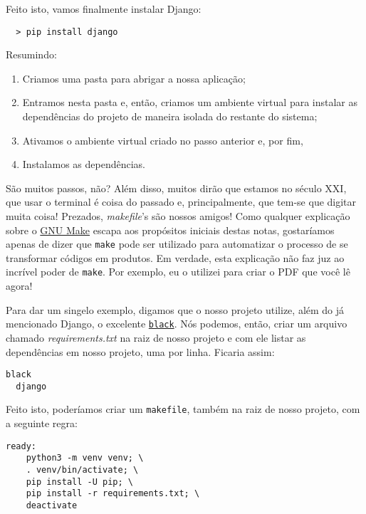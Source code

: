 Feito isto, vamos finalmente instalar Django:

\begin{lstlisting}
  > pip install django
\end{lstlisting}

Resumindo:

\begin{enumerate}
  \item
    Criamos uma pasta para abrigar a nossa aplicação;
  \item
    Entramos nesta pasta e, então, criamos um ambiente virtual para instalar as
    dependências do projeto de maneira isolada do restante do sistema;
  \item
    Ativamos o ambiente virtual criado no passo anterior e, por fim,
  \item
    Instalamos as dependências.
\end{enumerate}

São muitos passos, não? Além disso, muitos dirão que estamos no século XXI, que
usar o terminal é coisa do passado e, principalmente, que tem-se que digitar
muita coisa! Prezados, \textit{makefile}'s são nossos amigos! Como qualquer
explicação sobre o \href{https://www.gnu.org/software/make/}{GNU Make} escapa
aos propósitos iniciais destas notas, gostaríamos apenas de dizer que
\texttt{make} pode ser utilizado para automatizar o processo de se transformar
códigos em produtos. Em verdade, esta explicação não faz juz ao incrível poder
de \texttt{make}. Por exemplo, eu o utilizei para criar o PDF que você lê agora!

Para dar um singelo exemplo, digamos que o nosso projeto utilize, além do já
mencionado Django, o excelente
\href{https://github.com/psf/black}{\texttt{black}}. Nós podemos, então, criar
um arquivo chamado \textit{requirements.txt} na raiz de nosso projeto e com ele
listar as dependências em nosso projeto, uma por linha. Ficaria assim:

\begin{lstlisting}[caption={Um exemplo de requirements.txt}]
  black
  django
\end{lstlisting}

Feito isto, poderíamos criar um \texttt{makefile}, também na raiz de nosso
projeto, com a seguinte regra:

\begin{lstlisting}[caption={Exemplo de makefile}]
  ready:
    python3 -m venv venv; \
    . venv/bin/activate; \
    pip install -U pip; \
    pip install -r requirements.txt; \
    deactivate
\end{lstlisting}

